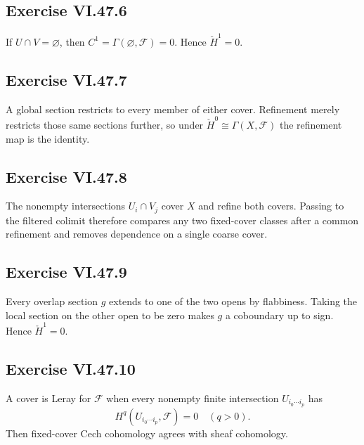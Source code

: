 \subsection*{Exercise VI.47.6}
\begin{solution}
If \(U\cap V=\varnothing\), then \(C^1=\Gamma(\varnothing,\mathcal F)=0\).  Hence \(\check H^1=0\).
\end{solution}

\subsection*{Exercise VI.47.7}
\begin{solution}
A global section restricts to every member of either cover.  Refinement merely restricts those same sections further, so under \(\check H^0\cong\Gamma(X,\mathcal F)\) the refinement map is the identity.
\end{solution}

\subsection*{Exercise VI.47.8}
\begin{solution}
The nonempty intersections \(U_i\cap V_j\) cover \(X\) and refine both covers.  Passing to the filtered colimit therefore compares any two fixed-cover classes after a common refinement and removes dependence on a single coarse cover.
\end{solution}

\subsection*{Exercise VI.47.9}
\begin{solution}
Every overlap section \(g\) extends to one of the two opens by flabbiness.  Taking the local section on the other open to be zero makes \(g\) a coboundary up to sign.  Hence \(\check H^1=0\).
\end{solution}

\subsection*{Exercise VI.47.10}
\begin{solution}
A cover is Leray for \(\mathcal F\) when every nonempty finite intersection \(U_{i_0\cdots i_p}\) has
\[
H^q(U_{i_0\cdots i_p},\mathcal F)=0\quad(q>0).
\]
Then fixed-cover Cech cohomology agrees with sheaf cohomology.
\end{solution}

